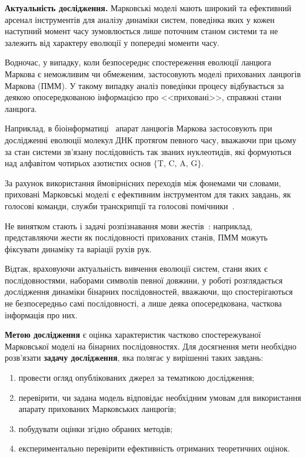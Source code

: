 \textbf{Актуальність дослідження.} Марковські моделі мають широкий та ефективний арсенал інструментів для аналізу динаміки систем, поведінка яких у кожен наступний момент часу зумовлюється лише поточним станом системи та не залежить від характеру еволюції у попередні моменти часу. 

Водночас, у випадку, коли безпосереднє спостереження еволюції ланцюга Маркова є неможливим чи обмеженим, застосовують моделі прихованих ланцюгів Маркова (ПММ). У такому випадку аналіз поведінки процесу відбувається за деякою опосередкованою інформацією про <<приховані>>, справжні стани ланцюга. 

Наприклад, в біоінформатиці~\cite[глава 9]{Koski2001} апарат ланцюгів Маркова застосовують при дослідженні еволюції молекул ДНК протягом певного часу, вважаючи при цьому за стан системи зв'язану послідовність так званих нуклеотидів, які формуються над алфавітом чотирьох азотистих основ $\{\text{T, C, A, G} \}$.  

За рахунок використання ймовірнісних переходів між фонемами чи словами, приховані Марковські моделі є ефективним інструментом для таких завдань, як голосові команди, служби транскрипції та голосові помічники~\cite{Kumar2023}.

Не винятком стають і задачі розпізнавання мови жестів~\cite{Chaaraoui2013}: наприклад, представляючи жести як послідовності прихованих станів, ПММ можуть фіксувати динаміку та варіації рухів рук.

Відтак, враховуючи актуальність вивчення еволюції систем, стани яких є послідовностями, наборами символів певної довжини, у роботі розглядається дослідження динаміки бінарних послідовностей, вважаючи, що спостерігаються не безпосередньо самі послідовності, а лише деяка опосередкована, часткова інформація про них.

\textbf{Метою дослідження} є оцінка характеристик частково спостережуваної Марковської моделі на бінарних послідовностях. Для досягнення мети необхідно розв'язати \textbf{задачу дослідження}, яка полягає у вирішенні таких завдань:

\begin{enumerate}
\item провести огляд опублікованих джерел за тематикою дослідження;
\item перевірити, чи задана модель відповідає необхідним умовам для використання апарату прихованих Марковських ланцюгів;
\item побудувати оцінки згідно обраних методів;
\item експериментально перевірити ефективність отриманих теоретичних оцінок.
\end{enumerate}

